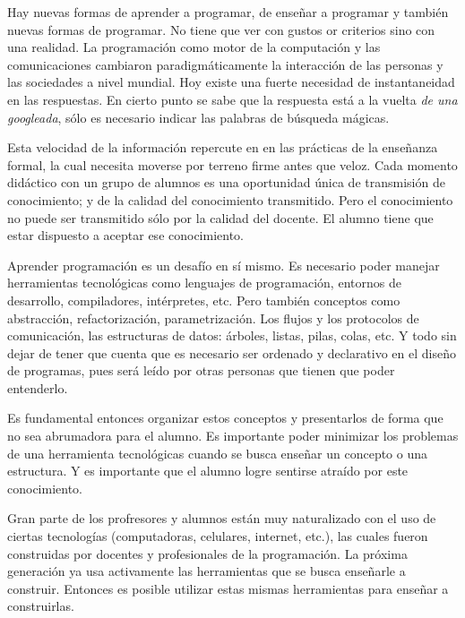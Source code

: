 
Hay nuevas formas de aprender a programar, de enseñar a programar
y también nuevas formas de programar. No tiene que ver con gustos or criterios
sino con una realidad. La programación como motor de la computación y
las comunicaciones cambiaron paradigmáticamente la interacción de las
personas y las sociedades a nivel mundial.
Hoy existe una fuerte necesidad de instantaneidad en las respuestas.
En cierto punto se sabe que la respuesta está a la vuelta
\textit{de una googleada}, sólo es necesario indicar las palabras
de búsqueda mágicas.

Esta velocidad de la información repercute en en las prácticas de
la enseñanza formal, la cual necesita moverse por terreno firme
antes que veloz. Cada momento didáctico con un grupo de alumnos
es una oportunidad única de transmisión de conocimiento; y de la
calidad del conocimiento transmitido.
Pero el conocimiento no puede ser transmitido sólo por la calidad del docente.
El alumno tiene que estar dispuesto a aceptar ese conocimiento.

Aprender programación es un desafío en sí mismo. Es necesario poder
manejar herramientas tecnológicas como lenguajes de programación,
entornos de desarrollo, compiladores, intérpretes, etc. Pero también
conceptos como abstracción, refactorización, parametrización.
Los flujos y los protocolos de comunicación, las
estructuras de datos: árboles, listas, pilas, colas, etc.
Y todo sin dejar de tener que cuenta que es necesario ser ordenado y declarativo
en el diseño de programas, pues será leído por otras personas que
tienen que poder entenderlo.

Es fundamental entonces organizar estos conceptos y presentarlos
de forma que no sea abrumadora para el alumno. Es importante poder
minimizar los problemas de una herramienta tecnológicas cuando
se busca enseñar un concepto o una estructura.
Y es importante que el alumno logre sentirse atraído por este conocimiento.

Gran parte de los profresores y alumnos están muy naturalizado con el
uso de ciertas tecnologías (computadoras, celulares, internet, etc.),
las cuales fueron construidas por docentes y profesionales de la programación.
La próxima generación ya usa activamente las herramientas que se busca
enseñarle a construir. Entonces es posible utilizar estas mismas herramientas
para enseñar a construirlas.

